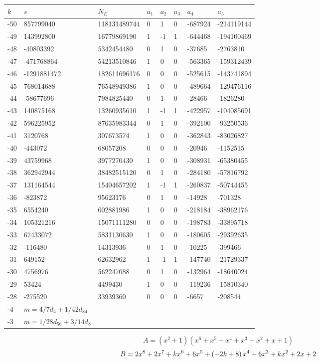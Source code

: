 \documentclass{amsart}
\begin{document}
\begin{longtable}{|l|l|l|lllll|}
\hline
$k$ & $s$ & $N_E$ & $a_1$ & $a_2$ & $a_3$ & $a_4$ & $a_5$\\
\hline
-50&857799040&118131489744&0&1&0&-687924&-214119144\\
-49&143992800&16779869190&1&-1&1&-644468&-194100469\\
-48&-40803392&5342454480&0&1&0&-37685&-2763810\\
-47&-471768864&54213510846&1&0&0&-563365&-159312439\\
-46&-1291881472&182611696176&0&0&0&-525615&-143741894\\
-45&768014688&76548949386&1&0&0&-489664&-129476116\\
-44&-58677696&7984825440&0&1&0&-28466&-1826280\\
-43&140875168&13260935610&1&-1&1&-422957&-104085691\\
-42&596225952&87635983344&0&1&0&-392100&-93250536\\
-41&3120768&307673574&1&0&0&-362843&-83026827\\
-40&-443072&68057208&0&0&0&-20946&-1152515\\
-39&43759968&3977270430&1&0&0&-308931&-65380455\\
-38&362942944&38482515120&0&1&0&-284180&-57816792\\
-37&131164544&15404657202&1&-1&1&-260837&-50744455\\
-36&-823872&95623176&0&1&0&-14928&-701328\\
-35&6554240&602881986&1&0&0&-218184&-38962176\\
-34&105321216&15071111280&0&0&0&-198783&-33895718\\
-33&67433072&5831130630&1&0&0&-180605&-29392635\\
-32&-116480&14313936&0&1&0&-10225&-399466\\
-31&649152&62632962&1&-1&1&-147740&-21729337\\
-30&4756976&562247088&0&1&0&-132964&-18640024\\
-29&53424&4499430&1&0&0&-119236&-15810340\\
-28&-275520&33939360&0&0&0&-6657&-208544\\
-4&$m=4/7d_{4}+1/42d_{84}$&&\multicolumn{5}{c|}{}\\
-3&$m=1/28d_{56}+3/14d_{8}$&&\multicolumn{5}{c|}{}\\
\hline
\end{longtable}
$$A=(x^2
 + 1)(x^6
 + x^5
 + x^4
 + x^3
 + x^2
 + x
 + 1)$$
$$B=2\*x^8
 + 2\*x^7
 + k\*x^6
 + 6\*x^5
 + \left(-2\*k
 + 8\right) \*x^4
 + 6\*x^3
 + k\*x^2
 + 2\*x
 + 2$$
\end{document}
